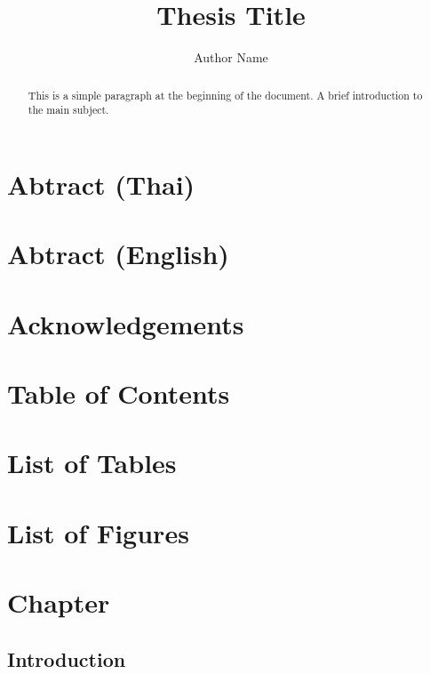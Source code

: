 \documentclass[12pt]{article}
\begin{document}
\title{Thesis Title}
\author{Author Name}

\begin{titlepage}
\maketitle
\end{titlepage}

\tableofcontents
\newpage
{}

\begin{abstract}
This is a simple paragraph at the beginning of the document. A brief introduction to the main subject.
\end{abstract}

\section{Abtract (Thai)}

\section{Abtract (English)}

\section{Acknowledgements}

\section{Table of Contents}

\section{List of Tables}

\section{List of Figures}

\section{Chapter}

\subsection{Introduction}
\end{document}
